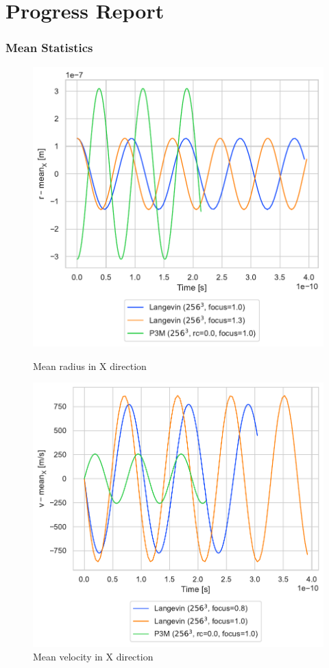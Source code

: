 \documentclass[.08pt,aspectratio=169]{beamer}
\begin{document}
\section{Progress Report}

\begin{frame}
    \frametitle{Mean Statistics}

\begin{figure}[!htb]
  \includegraphics[width=1.1\linewidth]{figures/rmean.pdf}
    \caption{Mean radius in X direction}
  \label{fig:awesome_image2}
\endminipage\hfill
{}%
  \includegraphics[width=1.1\linewidth]{figures/vmeanx.pdf}
    \caption{Mean velocity in X direction}
  \label{fig:awesome_image3}
\endminipage
\end{figure}


\end{frame}
\end{document}
